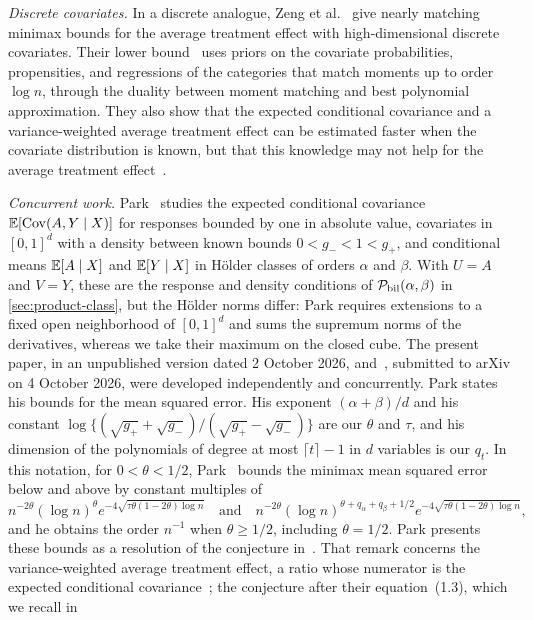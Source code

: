 \emph{Discrete covariates.} In a discrete analogue, Zeng
et al.~\cite{zeng} give nearly matching minimax bounds for the average
treatment effect with high-dimensional discrete covariates. Their lower
bound~\cite[Section~3.2]{zeng} uses priors on the covariate
probabilities, propensities, and regressions of the categories that
match moments up to order $\log n$, through the duality between moment
matching and best polynomial approximation. They also show that the
expected conditional covariance and a variance-weighted average
treatment effect can be estimated faster when the covariate
distribution is known, but that this knowledge may not help for the
average treatment effect~\cite[Section~5]{zeng}.

\emph{Concurrent work.} Park~\cite{park} studies the expected
conditional covariance $\mathbb E[\operatorname{Cov}(A,Y\mid X)]$ for responses bounded by
one in absolute value, covariates in $[0,1]^d$ with a density between
known bounds $0<g_-<1<g_+$, and conditional means $\mathbb E[A\mid X]$ and
$\mathbb E[Y\mid X]$ in H\"older classes of orders $\alpha$ and $\beta$. With
$U=A$ and $V=Y$, these are the response and density conditions of
$\mathcal P_{\rm bil}(\alpha,\beta)$ in \cref{sec:product-class}, but the
H\"older norms differ: Park requires extensions to a fixed open
neighborhood of $[0,1]^d$ and sums the supremum norms of the
derivatives, whereas we take their maximum on the closed cube. The
present paper, in an unpublished version dated 2 October 2026,
and~\cite{park}, submitted to arXiv on 4 October 2026, were developed
independently and concurrently. Park states his bounds for the mean
squared error. His exponent $(\alpha+\beta)/d$ and his constant
$\log\{(\sqrt{g_+}+\sqrt{g_-})/(\sqrt{g_+}-\sqrt{g_-})\}$ are our
$\theta$ and $\tau$, and his dimension of the polynomials of degree at
most $\lceil t\rceil-1$ in $d$ variables is our $q_t$. In this
notation, for $0<\theta<1/2$, Park~\cite[Theorem~1]{park} bounds the
minimax mean squared error below and above by constant multiples of
\[
 n^{-2\theta}(\log n)^{\theta}e^{-4\sqrt{\tau\theta(1-2\theta)\log n}}
 \quad\text{and}\quad
 n^{-2\theta}(\log n)^{\theta+q_\alpha+q_\beta+1/2}e^{-4\sqrt{\tau\theta(1-2\theta)\log n}},
\]
and he obtains the order $n^{-1}$ when $\theta\ge1/2$, including
$\theta=1/2$. Park presents these bounds as a resolution of the
conjecture in~\cite[Remark~4.2]{hoif2008}. That remark concerns the
variance-weighted average treatment effect, a ratio whose numerator is
the expected conditional covariance~\cite[Example~1c]{hoif2008}; the
conjecture after their equation~(1.3), which we recall in
